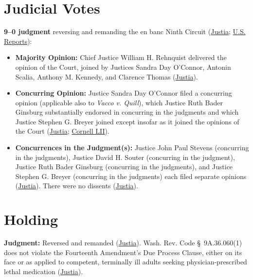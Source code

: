 \documentclass[12pt]{article}
\begin{document}
\section{Judicial Votes}

\textbf{9--0 judgment} reversing and remanding the en banc Ninth Circuit (\href{https://supreme.justia.com/cases/federal/us/521/702/}{Justia}; \href{https://tile.loc.gov/storage-services/service/ll/usrep/usrep521/usrep521702/usrep521702.pdf}{U.S. Reports}):
\begin{itemize}
\item \textbf{Majority Opinion:} Chief Justice William H. Rehnquist delivered the opinion of the Court, joined by Justices Sandra Day O'Connor, Antonin Scalia, Anthony M. Kennedy, and Clarence Thomas (\href{https://supreme.justia.com/cases/federal/us/521/702/}{Justia}).
\item \textbf{Concurring Opinion:} Justice Sandra Day O'Connor filed a concurring opinion (applicable also to \textit{Vacco v. Quill}), which Justice Ruth Bader Ginsburg substantially endorsed in concurring in the judgments and which Justice Stephen G. Breyer joined except insofar as it joined the opinions of the Court (\href{https://supreme.justia.com/cases/federal/us/521/702/}{Justia}; \href{https://www.law.cornell.edu/supct/html/96-110.ZC4.html}{Cornell LII}).
\item \textbf{Concurrences in the Judgment(s):} Justice John Paul Stevens (concurring in the judgments), Justice David H. Souter (concurring in the judgment), Justice Ruth Bader Ginsburg (concurring in the judgments), and Justice Stephen G. Breyer (concurring in the judgments) each filed separate opinions (\href{https://supreme.justia.com/cases/federal/us/521/702/}{Justia}). There were no dissents (\href{https://supreme.justia.com/cases/federal/us/521/702/}{Justia}).
\end{itemize}

\section{Holding}

\textbf{Judgment:} Reversed and remanded (\href{https://supreme.justia.com/cases/federal/us/521/702/}{Justia}). Wash. Rev. Code \S~9A.36.060(1) does not violate the Fourteenth Amendment's Due Process Clause, either on its face or as applied to competent, terminally ill adults seeking physician-prescribed lethal medication (\href{https://supreme.justia.com/cases/federal/us/521/702/}{Justia}).
\end{document}
